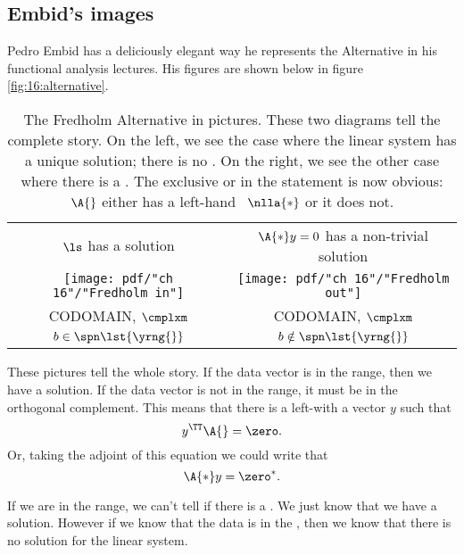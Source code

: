 \subsection{Embid's images}
Pedro Embid has a deliciously elegant way he represents the Alternative in his functional analysis lectures. His figures are shown below in figure \eqref{fig:16:alternative}.
\begin{table}[htdp]
\begin{center}
\begin{tabular}{cc}
$\ls$ has a solution &
$\A{*}y=0$ has a non-trivial solution \\
\texttt{[image: pdf/"ch 16"/"Fredholm in"]} &
\texttt{[image: pdf/"ch 16"/"Fredholm out"]} \\
CODOMAIN, $\cmplxm$ &
CODOMAIN, $\cmplxm$ \\[10pt]
$b \in \spn \lst{\yrng{}}$ &
$b \notin \spn \lst{\yrng{}}$
\end{tabular}
\end{center}
\label{fig:16:alternative}
\caption[The Fredholm Alternative in pictures]{The Fredholm Alternative in pictures. These two diagrams tell the complete story. On the left, we see the case where the linear system has a unique solution; there is no \ns. On the right, we see the other case where there is a \ns. The exclusive or in the statement is now obvious: $\A{}$ either has a left-hand \ns \ $\nlla{*}$ or it does not.}
\end{table}%

These pictures tell the whole story. If the data vector is in the range, then we have a solution. If the data vector is not in the range, it must be in the orthogonal complement. This means that there is a left-\ns with a vector $y$ such that
\begin{equation}
  y^{\TT}\A{} = \zero.
\end{equation}
Or, taking the adjoint of this equation we could write that
\begin{equation}
  \A{*}y =\zero^{*}.
\end{equation}

If we are in the range, we can't tell if there is a \ns. We just know that we have a solution. However if we know that the data is in the \ns, then we know that there is no solution for the linear system.

